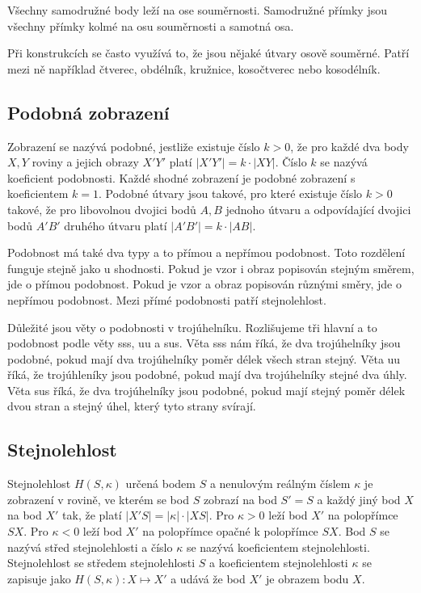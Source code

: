 \documentclass[12pt]{article}
\begin{document}
Všechny samodružné body leží na ose souměrnosti. Samodružné přímky jsou všechny přímky kolmé na osu
souměrnosti a samotná osa.

Při konstrukcích se často využívá to, že jsou nějaké útvary osově souměrné. Patří mezi ně
například čtverec, obdélník, kružnice, kosočtverec nebo kosodélník.

\subsection*{Podobná zobrazení}
Zobrazení se nazývá podobné, jestliže existuje číslo $k > 0$, že pro každé dva body $X, Y$ roviny a
jejich obrazy $X'Y'$ platí $|X'Y'| = k \cdot |XY|$. Číslo $k$ se nazývá koeficient podobnosti. Každé
shodné zobrazení je podobné zobrazení s koeficientem $k = 1$. Podobné útvary jsou takové, pro které
existuje číslo $k > 0$ takové, že pro libovolnou dvojici bodů $A, B$ jednoho útvaru a odpovídající
dvojici bodů $A'B'$ druhého útvaru platí $|A'B'| = k \cdot |AB|$.

Podobnost má také dva typy a to přímou a nepřímou podobnost. Toto rozdělení funguje stejně jako
u shodnosti. Pokud je vzor i obraz popisován stejným směrem, jde o přímou podobnost. Pokud je vzor
a obraz popisován různými směry, jde o nepřímou podobnost. Mezi přímé podobnosti patří stejnolehlost.

Důležité jsou věty o podobnosti v trojúhelníku. Rozlišujeme tři hlavní a to podobnost podle věty sss,
uu a sus. Věta sss nám říká, že dva trojúhelníky jsou podobné, pokud mají dva trojúhelníky poměr
délek všech stran stejný. Věta uu říká, že trojúhleníky jsou podobné, pokud mají dva trojúhelníky
stejné dva úhly. Věta sus říká, že dva trojúhelníky jsou podobné, pokud mají stejný poměr délek
dvou stran a stejný úhel, který tyto strany svírají.

\subsection*{Stejnolehlost}
Stejnolehlost $H(S, \kappa)$ určená bodem $S$ a nenulovým reálným číslem $\kappa$ je zobrazení v
rovině, ve kterém se bod $S$ zobrazí na bod $S' = S$ a každý jiný bod $X$ na bod $X'$ tak, že platí
$|X'S| = |\kappa| \cdot |XS|$. Pro $\kappa > 0$ leží bod $X'$ na polopřímce $SX$. Pro $\kappa < 0$
leží bod $X'$ na polopřímce opačné k polopřímce $SX$. Bod $S$ se nazývá střed stejnolehlosti a číslo
$\kappa$ se  nazývá koeficientem stejnolehlosti. Stejnolehlost se středem stejnolehlosti $S$ a
koeficientem stejnolehlosti $\kappa$ se zapisuje jako $H(S, \kappa) : X \mapsto X'$ a udává že bod
$X'$ je obrazem bodu $X$.
\end{document}
